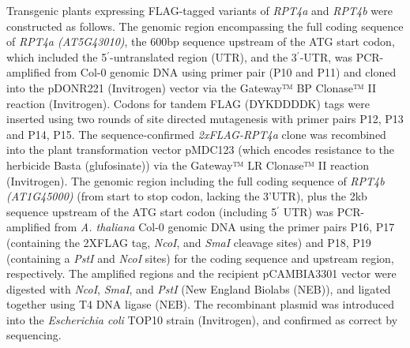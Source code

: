 	Transgenic plants expressing FLAG-tagged variants of \textit{RPT4a} and \textit{RPT4b} were constructed as follows. The genomic region encompassing the full coding sequence of \textit{RPT4a (AT5G43010)}, the 600bp sequence upstream of the ATG start codon, which included the 5$^{\prime}$-untranslated region (UTR), and the 3$^{\prime}$-UTR, was PCR-amplified from Col-0 genomic DNA using primer pair (P10 and P11) and cloned into the pDONR221 (Invitrogen) vector via the Gateway™ BP Clonase™ II reaction (Invitrogen). Codons for tandem FLAG (DYKDDDDK) tags were inserted using two rounds of site directed mutagenesis \citep{edelheit09} with primer pairs P12, P13 and P14, P15. The sequence-confirmed \textit{2xFLAG-RPT4a} clone was recombined into the plant transformation vector pMDC123 (which encodes resistance to the herbicide Basta (glufosinate)) via the Gateway™ LR Clonase™ II reaction (Invitrogen). The genomic region including the full coding sequence of \textit{RPT4b (AT1G45000)} (from start to stop codon, lacking the 3'UTR), plus the 2kb sequence upstream of the ATG start codon (including 5$^{\prime}$ UTR) was PCR-amplified from \textit{A. thaliana} Col-0 genomic DNA using the primer pairs P16, P17 (containing the 2XFLAG tag, \textit{NcoI}, and \textit{SmaI} cleavage sites) and P18, P19 (containing a \textit{PstI} and \textit{NcoI} sites) for the coding sequence and upstream region, respectively. The amplified regions and the recipient pCAMBIA3301 vector were digested with \textit{NcoI}, \textit{SmaI}, and \textit{PstI} (New England Biolabs (NEB)), and ligated together using T4 DNA ligase (NEB). The recombinant plasmid was introduced into the \textit{Escherichia coli} TOP10 strain (Invitrogen), and confirmed as correct by sequencing. 
	
